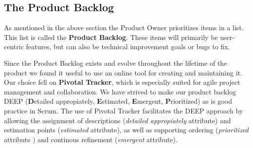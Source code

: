 \subsection{The Product Backlog}

As mentioned in the above section the Product Owner prioritizes items in a list. This list is called the \textbf{Product Backlog}. These items will primarily be user-centric features, but can also be technical improvement goals or bugs to fix.

Since the Product Backlog exists and evolve throughout the lifetime of the product we found it useful to use an online tool for creating and maintaining it. Our choice fell on \textbf{Pivotal Tracker}, which is especially suited for agile project management and collaboration. We have strived to make our product backlog DEEP (\textbf{D}etailed appropiately, \textbf{E}stimated, \textbf{E}mergent, \textbf{P}rioritized) as is good practice in Scrum.
The use of Pivotal Tracker facilitates the DEEP approach by allowing the assignment of descriptions (\textit{detailed appropiately} attribute) and  estimation points (\textit{estimated} attribute), as well as supporting  ordering (\textit{prioritized} attribute ) and continous refinement (\textit{emergent} attribute).

